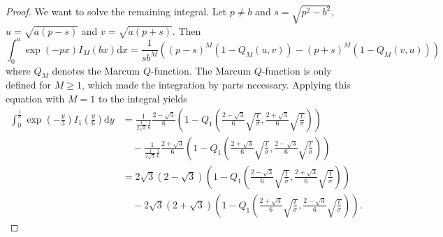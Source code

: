 \documentclass[a4paper,12pt]{article}
\theoremstyle{plain}
\theoremstyle{definition}
\begin{document}
\begin{proof}
	We want to solve the remaining integral. Let $p \neq b$ and $s = \sqrt{p^2 - b^2}$, $u = \sqrt{a (p - s)}$ and $v = \sqrt{a (p + s)}$. Then\cite{IntQFunction}
	\begin{equation}\label{eq: intmarcum}
		\int_0^a \exp(-p x) I_M ( b x ) \mathrm{d}x = \frac{1}{s b^M} \left( (p - s)^M ( 1 - Q_M(u, v) ) - (p + s)^M ( 1 - Q_M(v, u) ) \right)
	\end{equation}
	where $Q_M$ denotes the Marcum $Q$-function. The Marcum $Q$-function is only defined for $M \geq 1$, which made the integration by parts necessary. Applying this equation with $M = 1$ to the integral yields
	\begin{align*}
		\int_0^\frac{t}{\sigma} \exp \left( - \frac{y}{3} \right) I_1 \left( \frac{y}{6} \right) \mathrm{d}y &= \frac{1}{\frac{1}{2 \sqrt{3}} \frac{1}{6}} \frac{2 - \sqrt{3}}{6} \left( 1 - Q_1 \left( \frac{2 - \sqrt{3}}{6} \sqrt{\frac{t}{\sigma}}, \frac{2 + \sqrt{3}}{6} \sqrt{\frac{t}{\sigma}} \right) \right) \\
		&\quad - \frac{1}{\frac{1}{2 \sqrt{3}} \frac{1}{6}} \frac{2 + \sqrt{3}}{6} \left( 1 - Q_1 \left( \frac{2 + \sqrt{3}}{6} \sqrt{\frac{t}{\sigma}}, \frac{2 - \sqrt{3}}{6} \sqrt{\frac{t}{\sigma}} \right) \right) \\
		&= 2 \sqrt{3} (2 - \sqrt{3}) \left( 1 - Q_1 \left( \frac{2 - \sqrt{3}}{6} \sqrt{\frac{t}{\sigma}}, \frac{2 + \sqrt{3}}{6} \sqrt{\frac{t}{\sigma}} \right) \right) \\
		&\quad - 2 \sqrt{3} (2 + \sqrt{3}) \left( 1 - Q_1 \left( \frac{2 + \sqrt{3}}{6} \sqrt{\frac{t}{\sigma}}, \frac{2 - \sqrt{3}}{6} \sqrt{\frac{t}{\sigma}} \right) \right).
	\end{align*}
	

\end{proof}
\end{document}
